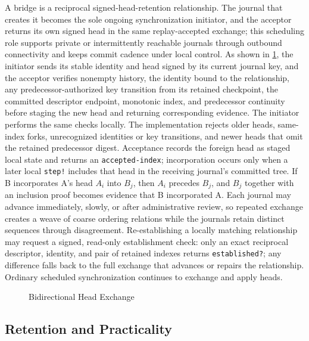 A bridge is a reciprocal signed-head-retention relationship. The journal that creates it becomes the sole ongoing synchronization initiator, and the acceptor returns its own signed head in the same replay-accepted exchange; this scheduling role supports private or intermittently reachable journals through outbound connectivity and keeps commit cadence under local control. As shown in \cref{fig:bridge-reciprocal}, the initiator sends its stable identity and head signed by its current journal key, and the acceptor verifies nonempty history, the identity bound to the relationship, any predecessor-authorized key transition from its retained checkpoint, the committed descriptor endpoint, monotonic index, and predecessor continuity before staging the new head and returning corresponding evidence. The initiator performs the same checks locally. The implementation rejects older heads, same-index forks, unrecognized identities or key transitions, and newer heads that omit the retained predecessor digest. Acceptance records the foreign head as staged local state and returns an \texttt{accepted-index}; incorporation occurs only when a later local \texttt{step!} includes that head in the receiving journal's committed tree. If B incorporates A's head $A_i$ into $B_j$, then $A_i$ precedes $B_j$, and $B_j$ together with an inclusion proof becomes evidence that B incorporated A. Each journal may advance immediately, slowly, or after administrative review, so repeated exchange creates a weave of coarse ordering relations while the journals retain distinct sequences through disagreement. Re-establishing a locally matching relationship may request a signed, read-only establishment check: only an exact reciprocal descriptor, identity, and pair of retained indexes returns \texttt{established?}; any difference falls back to the full exchange that advances or repairs the relationship. Ordinary scheduled synchronization continues to exchange and apply heads.

\begin{figure}[t]
  \centering
  \resizebox{\textwidth}{!}{}
  \caption{Bidirectional Head Exchange}
  \label{fig:bridge-reciprocal}
\end{figure}

\subsection{Retention and Practicality}

